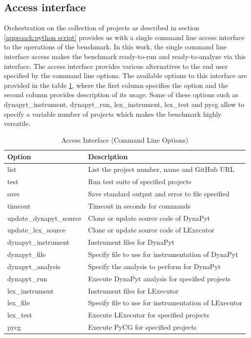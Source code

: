 \subsection{Access interface}
\label{approach:access interface}
Orchestration on the collection of projects as described in section \ref{approach:python script} provides us with a single command line access interface to the operations of the benchmark.
In this work, the single command line interface access makes the benchmark ready-to-run and ready-to-analyze via this interface.
The access interface provides various alternatives to the end user specified by the command line options.
The available options to this interface are provided in the table \ref{table:access interface options}, where the first column specifies the option and the second column provides description of its usage.
Some of these options such as dynapyt\_instrument, dynapyt\_run, lex\_instrument, lex\_test and pycg allow to specify a variable number of projects which makes the benchmark highly versatile.

\begin{table}[ht]
    \centering
    \begin{tabular}{ll}
    \hline
    \textbf{Option} & \textbf{Description}\\
    \hline
    list    & List the project number, name and GitHub URL\\
    test    & Run test suite of specified projects\\
    save    & Save standard output and error to file specified\\
    timeout & Timeout in seconds for commands\\
    update\_dynapyt\_source   & Clone or update source code of DynaPyt\\
    update\_lex\_source   & Clone or update source code of LExecutor\\
    dynapyt\_instrument  & Instrument files for DynaPyt\\
    dynapyt\_file    & Specify file to use for instrumentation of DynaPyt\\
    dynapyt\_analysis    & Specify the analysis to perform for DynaPyt\\
    dynapyt\_run & Execute DynaPyt analysis for specified projects\\
    lex\_instrument  & Instrument files for LExecutor\\
    lex\_file    & Specify file to use for instrumentation of LExecutor\\
    lex\_test    & Execute LExecutor for specified projects\\
    pycg    & Execute PyCG for specified projects\\
    \hline
    \end{tabular}
    \caption{Access Interface (Command Line Options)}
    \label{table:access interface options}
\end{table}

